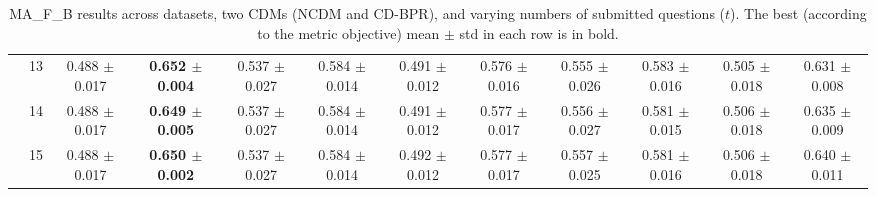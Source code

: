 \begin{table*}[t]
{\begin{tabular}{%
  ll
  @{\quad}
  c@{\hskip 4pt}c
  @{\quad\quad}
  c@{\hskip 4pt}c
  @{\quad\quad}
  c@{\hskip 4pt}c
  @{\quad\quad}
  c@{\hskip 4pt}c
  @{\quad\quad}
  c@{\hskip 4pt}c
}
        & 13 & 0.488 $\pm$ 0.017 & \textbf{0.652 $\pm$ 0.004} & 0.537 $\pm$ 0.027 & 0.584 $\pm$ 0.014 & 0.491 $\pm$ 0.012 & 0.576 $\pm$ 0.016 & 0.555 $\pm$ 0.026 & 0.583 $\pm$ 0.016 & 0.505 $\pm$ 0.018 & 0.631 $\pm$ 0.008 \\
        & 14 & 0.488 $\pm$ 0.017 & \textbf{0.649 $\pm$ 0.005} & 0.537 $\pm$ 0.027 & 0.584 $\pm$ 0.014 & 0.491 $\pm$ 0.012 & 0.577 $\pm$ 0.017 & 0.556 $\pm$ 0.027 & 0.581 $\pm$ 0.015 & 0.506 $\pm$ 0.018 & 0.635 $\pm$ 0.009 \\
        & 15 & 0.488 $\pm$ 0.017 & \textbf{0.650 $\pm$ 0.002} & 0.537 $\pm$ 0.027 & 0.584 $\pm$ 0.014 & 0.492 $\pm$ 0.012 & 0.577 $\pm$ 0.017 & 0.557 $\pm$ 0.025 & 0.581 $\pm$ 0.016 & 0.506 $\pm$ 0.018 & 0.640 $\pm$ 0.011 \\
\bottomrule
\end{tabular}
}
\caption{MA_F_B results across datasets, two CDMs (NCDM and CD-BPR), and varying numbers of submitted questions ($t$). The best (according to the metric objective) mean $\pm$ std in each row is in bold.}
\label{tab:results-ma_f_b}
\end{table*}


